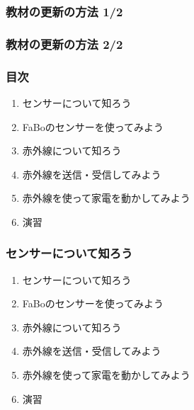 \begin{frame}[fragile]
    \frametitle{教材の更新の方法 1/2}
    \begin{description}
        \item[] 
    \end{description}
\end{frame}

\begin{frame}[fragile]
    \frametitle{教材の更新の方法 2/2}
    \begin{description}
        \item[] 
    \end{description}
\end{frame}

\begin{frame}[fragile]
    \frametitle{目次}
    \begin{description}
        \begin{enumerate}
            \item センサーについて知ろう
            \item FaBoのセンサーを使ってみよう
            \item 赤外線について知ろう
            \item 赤外線を送信・受信してみよう
            \item 赤外線を使って家電を動かしてみよう
            \item 演習
        \end{enumerate}
    \end{description}
\end{frame}

\begin{frame}[fragile]
    \frametitle{センサーについて知ろう}
    \begin{description}
        \begin{enumerate}
            \item センサーについて知ろう
            \item FaBoのセンサーを使ってみよう
            \item 赤外線について知ろう
            \item 赤外線を送信・受信してみよう
            \item 赤外線を使って家電を動かしてみよう
            \item 演習
        \end{enumerate}
    \end{description}
\end{frame}

